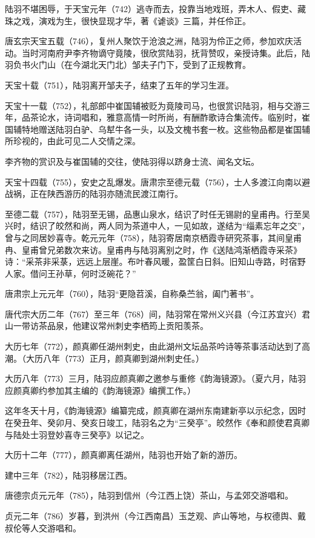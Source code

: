 \documentclass[12pt,UTF8]{ctexbook}
\begin{document}
陆羽不堪困辱，于天宝元年（742）逃寺而去，投靠当地戏班，弄木人、假吏、藏珠之戏，演戏为生，很快显现才华，著《谑谈》三篇，并任伶正。

唐玄宗天宝五载（746），复州人聚饮于沧浪之洲，陆羽为伶正之师，参加欢庆活动。当时河南府尹李齐物谪守竟陵，很欣赏陆羽，抚背赞叹，亲授诗集。此后，陆羽负书火门山（在今湖北天门北）邹夫子门下，受到了正规教育。

天宝十载（751），陆羽离开邹夫子，结束了五年的学习生涯。

天宝十一载（752），礼部郎中崔国辅被贬为竟陵司马，也很赏识陆羽，相与交游三年，品茶论水，诗词唱和，雅意高情一时所尚，有酬酢歌诗合集流传。临别时，崔国辅特地赠送陆羽白驴、乌犎牛各一头，以及文槐书套一枚。这些物品都是崔国辅所珍视的，由此可见二人交情之深。

李齐物的赏识及与崔国辅的交往，使陆羽得以跻身士流、闻名文坛。

天宝十四载（755），安史之乱爆发。唐肃宗至德元载（756），士人多渡江向南以避战祸，正在陕西游历的陆羽亦随流民渡江南行。

至德二载（757），陆羽至无锡，品惠山泉水，结识了时任无锡尉的皇甫冉。行至吴兴时，结识了皎然和尚，两人同为茶道中人，一见如故，遂结为“缁素忘年之交”，曾与之同居妙喜寺。乾元元年（758），陆羽寄居南京栖霞寺研究茶事，其间皇甫冉、皇甫曾兄弟数次来访。皇甫冉与陆羽离别之时，作《送陆鸿渐栖霞寺采茶》诗：“采茶非采菉，远远上层崖。布叶春风暖，盈筐白日斜。旧知山寺路，时宿野人家。借问王孙草，何时泛碗花？”

唐肃宗上元元年（760），陆羽“更隐苕溪，自称桑苎翁，阖门著书”。

唐代宗大历二年（767）至三年（768）间，陆羽常在常州义兴县（今江苏宜兴）君山一带访茶品泉，他建议常州刺史李栖筠上贡阳羡茶。

大历七年（772），颜真卿任湖州刺史，由此湖州文坛品茶吟诗等茶事活动达到了高潮。（大历八年（773）正月，颜真卿到湖州刺史任。）

大历八年（773）三月，陆羽应颜真卿之邀参与重修《韵海镜源》。（夏六月，陆羽应颜真卿约参加其主编的《韵海镜源》编撰工作。）

这年冬天十月，《韵海镜源》编纂完成，颜真卿在湖州东南建新亭以示纪念，因时在癸丑年、癸卯月、癸亥日竣工，陆羽名之为“三癸亭”。皎然作《奉和颜使君真卿与陆处士羽登妙喜寺三癸亭》以记之。

大历十二年（777），颜真卿离任湖州，陆羽也开始了新的游历。

建中三年（782），陆羽移居江西。

唐德宗贞元元年（785），陆羽到信州（今江西上饶）茶山，与孟郊交游唱和。

贞元二年（786）岁暮，到洪州（今江西南昌）玉芝观、庐山等地，与权德舆、戴叔伦等人交游唱和。
\end{document}

